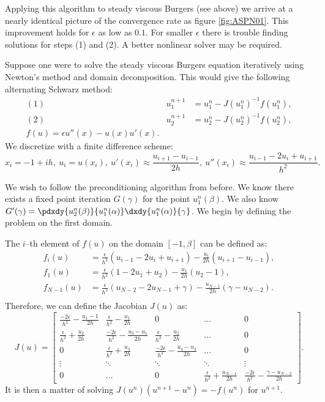 \documentclass{book}
\begin{document}
Applying this algorithm to steady viscous Burgers (see above) we arrive at a nearly identical picture of the convergence rate as figure \ref{fig:ASPN01}.
This improvement holds for $\epsilon$ as low as $0.1$.
For smaller $\epsilon$ there is trouble finding solutions for steps (1) and (2).
A better nonlinear solver may be required.

Suppose one were to solve the steady viscous Burgers equation iteratively using Newton's method and domain decomposition.
This would give the following alternating Schwarz method:
\begin{align*}
(1) & u^{n+1}_1 & = u^n_1 - J(u^n_1)^{-1} f(u^n_1) , \\
(2) & u^{n+1}_2 & = u^n_2 - J(u^n_2)^{-1} f(u^n_2) , \\
f(u) = \epsilon u''(x) - u(x) u'(x) .
\end{align*}
We discretize with a finite difference scheme:
\begin{equation*}
x_i = -1 + ih, \ u_i = u(x_i), \ u'(x_i) \approx \frac{u_{i+1} - u_{i-1}}{2h}, \ u''(x_i) \approx \frac{u_{i-1} - 2u_i + u_{i+1}}{h^2} .
\end{equation*}

We wish to follow the preconditioning algorithm from before.
We know there exists a fixed point iteration $G(\gamma)$ for the point $u^n_1(\beta)$.
We also know $G'(\gamma) = \pdxdy{u^n_2(\beta)}{u^n_1(\alpha)} \dxdy{u^n_1(\alpha)}{\gamma}$.
We begin by defining the problem on the first domain.

The $i$--th element of $f(u)$ on the domain $[-1,\beta]$ can be defined as:
\begin{align*}
f_i(u) & = \frac{\epsilon}{h^2} \left ( u_{i-1} - 2 u_i + u_{i+1} \right )
- \frac{u_i}{2h} \left ( u_{i+1} - u_{i-1} \right ) , \\
f_1(u) & = \frac{\epsilon}{h^2} \left ( 1 - 2 u_1 + u_2 \right )
- \frac{u_1}{2h} \left ( u_2 - 1 \right ) , \\
f_{N-1}(u) & = \frac{\epsilon}{h^2} \left ( u_{N-2} - 2 u_{N-1} + \gamma \right )
- \frac{u_{N-1}}{2h} \left ( \gamma - u_{N-2} \right ) . \\
\end{align*}
Therefore, we can define the Jacobian $J(u)$ as:
\begin{equation*}
J(u) = \begin{bmatrix} \frac{-2\epsilon}{h^2} - \frac{u_1 - 1}{2h} & \frac{\epsilon}{h^2} - \frac{u_1}{2h} & 0 & \dots & 0 \\
\frac{\epsilon}{h^2} + \frac{u_2}{2h} & \frac{-2\epsilon}{h^2} - \frac{u_3 - u_1}{2h} & \frac{\epsilon}{h^2} - \frac{u_2}{2h} & \dots & 0 \\
0 & \frac{\epsilon}{h^2} + \frac{u_3}{2h} & \frac{-2\epsilon}{h^2} - \frac{u_4 - u_2}{2h} & \dots & 0 \\
\vdots & \ddots & \ddots & \ddots & \vdots \\
0 & \dots & 0 & \frac{\epsilon}{h^2} + \frac{u_{N-1}}{2h} & \frac{-2\epsilon}{h^2} - \frac{\gamma - u_{N-2}}{2h} \end{bmatrix} .
\end{equation*}
It is then a matter of solving $J(u^n) (u^{n+1} - u^n) = -f(u^n)$ for $u^{n+1}$.
\end{document}
